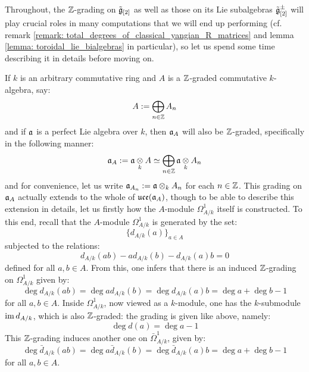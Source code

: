             \begin{remark} \label{remark: Z_gradings_on_toroidal_lie_algebras}
                Throughout, the $\mathbb{Z}$-grading on $\tilde{\mathfrak{g}}_{[2]}$ as well as those on its Lie subalgebras $\tilde{\mathfrak{g}}_{[2]}^{\pm}$ will play crucial roles in many computations that we will end up performing (cf. remark \ref{remark: total_degrees_of_classical_yangian_R_matrices} and lemma \ref{lemma: toroidal_lie_bialgebras} in particular), so let us spend some time describing it in details before moving on.

                If $k$ is an arbitrary commutative ring and $A$ is a $\mathbb{Z}$-graded commutative $k$-algebra, say:
                    $$A := \bigoplus_{n \in \mathbb{Z}} A_n$$
                and if $\mathfrak{a}$ is a perfect Lie algebra over $k$, then $\mathfrak{a}_A$ will also be $\mathbb{Z}$-graded, specifically in the following manner:
                    $$\a_A := \a \tensor_k A \cong \bigoplus_{n \in \Z} \a \tensor_k A_n$$
                and for convenience, let us write $\a_{A_n} := \a \tensor_k A_n$ for each $n \in \mathbb{Z}$. This grading on $\mathfrak{a}_A$ actually extends to the whole of $\mathfrak{uce}(\mathfrak{a}_A)$, though to be able to describe this extension in details, let us firstly how the $A$-module $\Omega^1_{A/k}$ itself is constructed. To this end, recall that the $A$-module $\Omega^1_{A/k}$ is generated by the set:
                    $$\{d_{A/k}(a)\}_{a \in A}$$
                subjected to the relations:
                    $$d_{A/k}(ab) - a d_{A/k}(b) - d_{A/k}(a) b = 0$$
                defined for all $a, b \in A$. From this, one infers that there is an induced $\mathbb{Z}$-grading on $\Omega^1_{A/k}$ given by:
                    $$\deg d_{A/k}(ab) = \deg a d_{A/k}(b) = \deg d_{A/k}(a) b = \deg a + \deg b - 1$$
                for all $a, b \in A$. Inside $\Omega^1_{A/k}$, now viewed as a $k$-module, one has the $k$-submodule $\operatorname{im} d_{A/k}$, which is also $\mathbb{Z}$-graded: the grading is given like above, namely:
                    $$\deg d(a) = \deg a - 1$$
                This $\mathbb{Z}$-grading induces another one on $\bar{\Omega}^1_{A/k}$, given by:
                    $$\deg \bar{d}_{A/k}(ab) = \deg a \bar{d}_{A/k}(b) = \deg \bar{d}_{A/k}(a) b = \deg a + \deg b - 1$$
                for all $a, b \in A$.


\end{remark}
